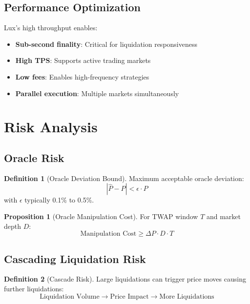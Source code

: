 \documentclass[11pt,a4paper]{article}
\theoremstyle{definition}
\newtheorem{definition}{Definition}
\newtheorem{proposition}{Proposition}
\begin{document}
\subsection{Performance Optimization}

Lux's high throughput enables:

\begin{itemize}
\item \textbf{Sub-second finality}: Critical for liquidation responsiveness
\item \textbf{High TPS}: Supports active trading markets
\item \textbf{Low fees}: Enables high-frequency strategies
\item \textbf{Parallel execution}: Multiple markets simultaneously
\end{itemize}

\section{Risk Analysis}

\subsection{Oracle Risk}

\begin{definition}[Oracle Deviation Bound]
Maximum acceptable oracle deviation:
\begin{equation}
|\hat{P} - P| < \epsilon \cdot P
\end{equation}
with $\epsilon$ typically 0.1\% to 0.5\%.
\end{definition}

\begin{proposition}[Oracle Manipulation Cost]
For TWAP window $T$ and market depth $D$:
\begin{equation}
\text{Manipulation Cost} \geq \Delta P \cdot D \cdot T
\end{equation}
\end{proposition}

\subsection{Cascading Liquidation Risk}

\begin{definition}[Cascade Risk]
Large liquidations can trigger price moves causing further liquidations:
\begin{equation}
\text{Liquidation Volume} \rightarrow \text{Price Impact} \rightarrow \text{More Liquidations}
\end{equation}
\end{definition}
\end{document}
